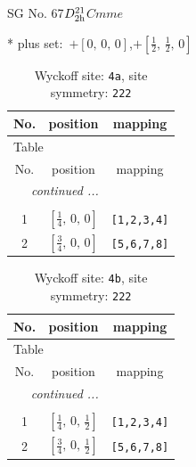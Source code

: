 \documentclass[fleqn,8pt]{jsarticle}
\begin{document}
\setcounter{MaxMatrixCols}{32}

\renewcommand{\tablename}{Table~}
\renewcommand{\figurename}{Figure~}
\begin{center}
\LARGE
SG No. 67\quad$D_{\rm 2h}^{21}$\quad$Cmme$\quad[ orthorhombic ]
\end{center}
* plus set:\,\,\,$+\left[ 0,\, 0,\, 0 \right]$,\quad $+\left[ \frac{1}{2},\, \frac{1}{2},\, 0 \right]$
\renewcommand{\arraystretch}{1.2}
\begin{longtable}{ccc}
\caption{Wyckoff site: {\tt 4a}, site symmetry: {\tt 222}}
 \\
 \hline \hline
No. & position & mapping \\ \hline \endfirsthead

\multicolumn{2}{l}{\tablename\ \thetable{}} \\
 \hline \hline
No. & position & mapping \\ \hline \endhead

 \hline \hline
\multicolumn{2}{r}{\footnotesize\it continued ...} \\ \endfoot

 \hline \hline
\multicolumn{2}{r}{} \\ \endlastfoot

1 & $\left[ \frac{1}{4},\, 0,\, 0 \right]$ & {\tt [1,2,3,4]} \\ \hline
2 & $\left[ \frac{3}{4},\, 0,\, 0 \right]$ & {\tt [5,6,7,8]} \\
\end{longtable}
\renewcommand{\arraystretch}{1.2}
\begin{longtable}{ccc}
\caption{Wyckoff site: {\tt 4b}, site symmetry: {\tt 222}}
 \\
 \hline \hline
No. & position & mapping \\ \hline \endfirsthead

\multicolumn{2}{l}{\tablename\ \thetable{}} \\
 \hline \hline
No. & position & mapping \\ \hline \endhead

 \hline \hline
\multicolumn{2}{r}{\footnotesize\it continued ...} \\ \endfoot

 \hline \hline
\multicolumn{2}{r}{} \\ \endlastfoot

1 & $\left[ \frac{1}{4},\, 0,\, \frac{1}{2} \right]$ & {\tt [1,2,3,4]} \\ \hline
2 & $\left[ \frac{3}{4},\, 0,\, \frac{1}{2} \right]$ & {\tt [5,6,7,8]} \\
\end{longtable}
\end{document}
